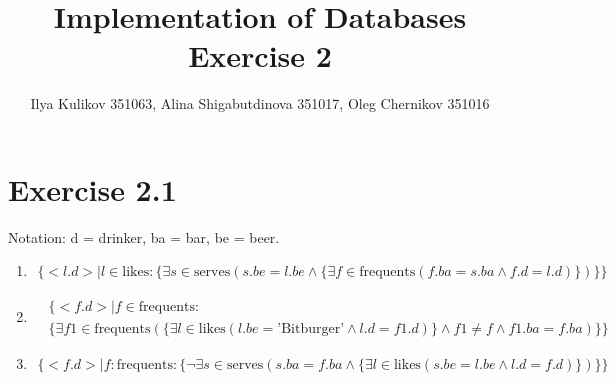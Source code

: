 \documentclass[10pt]{article}
\title{Implementation of Databases Exercise 2}
\author{Ilya Kulikov 351063, Alina Shigabutdinova 351017, Oleg Chernikov 351016}
\begin{document}
  \maketitle
  \section*{Exercise 2.1}
  	Notation: d = drinker, ba = bar, be = beer.
  \begin{enumerate}[label=\arabic*.]
      \item
      \begin{align*}
        \{<l.d> | l \in \text{likes}: \{\exists s \in \text{serves}(s.be = l.be \wedge \{ \exists f \in \text{frequents}(f.ba = s.ba \wedge f.d = l.d)\})\}\}
      \end{align*}
      \item
      \begin{align*}
        &\{<f.d> | f \in \text{frequents} : \\
        &\{\exists f1 \in \text{frequents} (\{\exists l \in \text{likes} (l.be = \text{'Bitburger'} \wedge l.d = f1.d)\} \wedge f1 \neq f \wedge f1.ba = f.ba)\}\}
      \end{align*}
      \item
      \begin{align*}
        \{<f.d> | f: \text{frequents} : \{\neg \exists s \in \text{serves} (s.ba = f.ba \wedge \{\exists l \in \text{likes} (s.be = l.be \wedge l.d = f.d)\})\}\}
      \end{align*}
  \end{enumerate}
\end{document}

